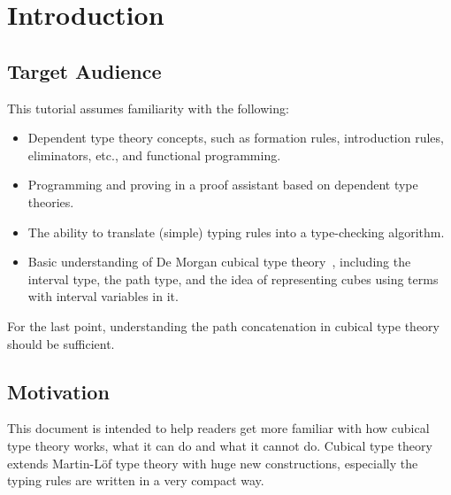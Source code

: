 \section{Introduction}
\subsection{Target Audience}
This tutorial assumes familiarity with the following:
\begin{itemize}
\item Dependent type theory concepts, such as formation rules,
introduction rules, eliminators, etc., and functional programming.
\item Programming and proving in a proof assistant based on dependent type theories.
\item The ability to translate (simple) typing rules into a type-checking algorithm.
\item Basic understanding of De Morgan cubical type theory~\cite{CCHM,CHM},
including the interval type, the path type,
and the idea of representing cubes using terms with interval variables in it.
\end{itemize}
For the last point, understanding the path concatenation in cubical type theory
should be sufficient.
\subsection{Motivation}
This document is intended to help readers get more familiar with how
cubical type theory works, what it can do and what it cannot do.
Cubical type theory extends Martin-L\"{o}f type theory with huge new constructions,
especially the typing rules are written in a very compact way.

